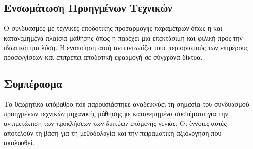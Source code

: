 \subsection{Ενσωμάτωση Προηγμένων Τεχνικών}

Ο συνδυασμός  με τεχνικές αποδοτικής προσαρμογής παραμέτρων όπως η  και κατανεμημένα πλαίσια μάθησης όπως η  παρέχει μια επεκτάσιμη και φιλική προς την ιδιωτικότητα λύση. Η ενοποίηση αυτή αντιμετωπίζει τους περιορισμούς των επιμέρους προσεγγίσεων και επιτρέπει αποδοτική εφαρμογή σε σύγχρονα δίκτυα.

\subsection{Συμπέρασμα}

Το θεωρητικό υπόβαθρο που παρουσιάστηκε αναδεικνύει τη σημασία του συνδυασμού προηγμένων τεχνικών μηχανικής μάθησης με κατανεμημένα συστήματα για την αντιμετώπιση των προκλήσεων των δικτύων επόμενης γενιάς. Οι έννοιες αυτές αποτελούν τη βάση για τη μεθοδολογία και την πειραματική αξιολόγηση που ακολουθεί.